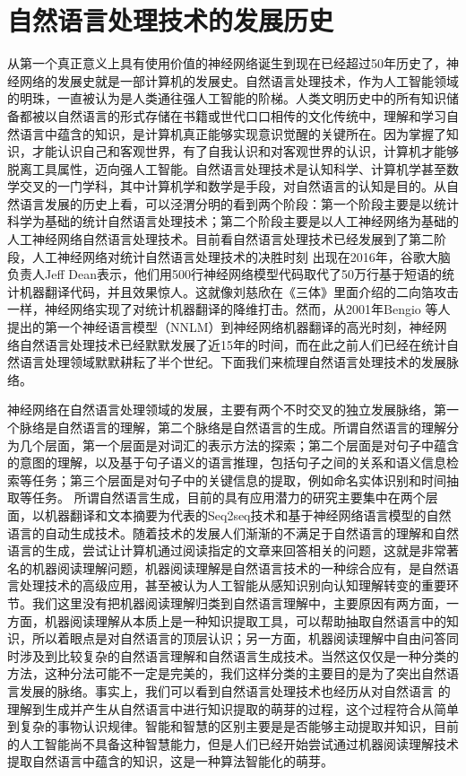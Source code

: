 \documentclass[twoside,a4paper,12pt]{book}%
\begin{document}
\chapter{自然语言处理技术的发展历史}
从第一个真正意义上具有使用价值的神经网络诞生到现在已经超过50年历史了，神经网络的发展史就是一部计算机的发展史。自然语言处理技术，作为人工智能领域的明珠，一直被认为是人类通往强人工智能的阶梯。人类文明历史中的所有知识储备都被以自然语言的形式存储在书籍或世代口口相传的文化传统中，理解和学习自然语言中蕴含的知识，是计算机真正能够实现意识觉醒的关键所在。因为掌握了知识，才能认识自己和客观世界，有了自我认识和对客观世界的认识，计算机才能够脱离工具属性，迈向强人工智能。自然语言处理技术是认知科学、计算机学甚至数学交叉的一门学科，其中计算机学和数学是手段，对自然语言的认知是目的。从自然语言发展的历史上看，可以泾渭分明的看到两个阶段：第一个阶段主要是以统计科学为基础的统计自然语言处理技术；第二个阶段主要是以人工神经网络为基础的人工神经网络自然语言处理技术。目前看自然语言处理技术已经发展到了第二阶段，人工神经网络对统计自然语言处理技术的决胜时刻
出现在2016年，谷歌大脑负责人Jeff Dean表示，他们用500行神经网络模型代码取代了50万行基于短语的统计机器翻译代码，并且效果惊人。这就像刘慈欣在《三体》里面介绍的二向箔攻击一样，神经网络实现了对统计机器翻译的降维打击。然而，从2001年Bengio 等人提出的第一个神经语言模型（\gls{NNLM}）到神经网络机器翻译的高光时刻，神经网络自然语言处理技术已经默默发展了近15年的时间，而在此之前人们已经在统计自然语言处理领域默默耕耘了半个世纪。下面我们来梳理自然语言处理技术的发展脉络。

神经网络在自然语言处理领域的发展，主要有两个不时交叉的独立发展脉络，第一个脉络是自然语言的理解，第二个脉络是自然语言的生成。所谓自然语言的理解分为几个层面，第一个层面是对词汇的表示方法的探索；第二个层面是对句子中蕴含的意图的理解，以及基于句子语义的语言推理，包括句子之间的关系和语义信息检索等任务；第三个层面是对句子中的关键信息的提取，例如命名实体识别和时间抽取等任务。
所谓自然语言生成，目前的具有应用潜力的研究主要集中在两个层面，以机器翻译和文本摘要为代表的Seq2seq技术和基于神经网络语言模型的自然语言的自动生成技术。随着技术的发展人们渐渐的不满足于自然语言的理解和自然语言的生成，尝试让计算机通过阅读指定的文章来回答相关的问题，这就是非常著名的机器阅读理解问题，机器阅读理解是自然语言技术的一种综合应有，是自然语言处理技术的高级应用，甚至被认为人工智能从感知识别向认知理解转变的重要环节。我们这里没有把机器阅读理解归类到自然语言理解中，主要原因有两方面，一方面，机器阅读理解从本质上是一种知识提取工具，可以帮助抽取自然语言中的知识，所以着眼点是对自然语言的顶层认识；另一方面，机器阅读理解中自由问答同时涉及到比较复杂的自然语言理解和自然语言生成技术。当然这仅仅是一种分类的方法，这种分法可能不一定是完美的，我们这样分类的主要目的是为了突出自然语言发展的脉络。事实上，我们可以看到自然语言处理技术也经历从对自然语言
的理解到生成并产生从自然语言中进行知识提取的萌芽的过程，这个过程符合从简单到复杂的事物认识规律。智能和智慧的区别主要是是否能够主动提取并知识，目前的人工智能尚不具备这种智慧能力，但是人们已经开始尝试通过机器阅读理解技术提取自然语言中蕴含的知识，这是一种算法智能化的萌芽。
\end{document}
